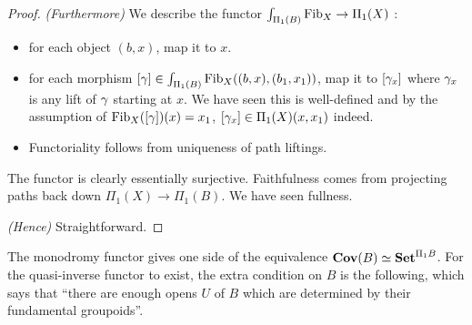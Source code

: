 \documentclass[./main.tex]{subfiles}
\begin{document}
\begin{proof}
  \textit{(Furthermore)}
  We describe the functor $\int_{\Pi_1(B)} \operatorname{Fib}_X \to \Pi_1(X)$ :
  \begin{itemize}
    \item for each object $(b,x)$, map it to $x$.
    \item for each morphism $[\gamma] \in \int_{\Pi_1(B)} \operatorname{Fib}_X ((b,x),(b_1,x_1))$,
    map it to $[\gamma_x]$ where 
    $\gamma_x$ is any lift of $\gamma$ starting at $x$.
    We have seen this is well-defined and 
    by the assumption of $\operatorname{Fib}_X([\gamma])(x) = x_1$,
    $[\gamma_x] \in \Pi_1(X)(x,x_1)$ indeed.
    \item Functoriality follows from uniqueness of path liftings.
  \end{itemize}
  The functor is clearly essentially surjective.
  Faithfulness comes from projecting paths 
  back down $\Pi_1(X) \to \Pi_1(B)$.
  We have seen fullness. 

  \textit{(Hence)} Straightforward. 
\end{proof}

\begin{rmk}
  The monodromy functor gives one side of the equivalence
  $\mathbf{Cov}(B) \simeq \mathbf{Set}^{\Pi_1 B}$.
  For the quasi-inverse functor to exist,
  the extra condition on $B$ is the following,
  which says that ``there are enough opens $U$ of $B$ which are 
  determined by their fundamental groupoids''.
\end{rmk}
\end{document}
